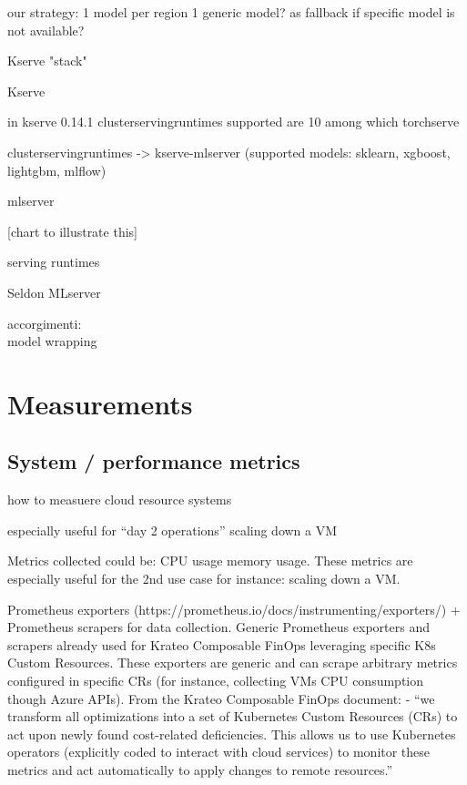 our strategy:
1 model per region
1 generic model? as fallback if specific model is not available?




Kserve "stack"

Kserve

in kserve 0.14.1
clusterservingruntimes
supported are 10
among which 
torchserve

clusterservingruntimes -> kserve-mlserver (supported models: sklearn, xgboost, lightgbm, mlflow)

mlserver

[chart to illustrate this]







serving runtimes

Seldon MLserver


accorgimenti: \\
model wrapping

\section{Measurements}




\subsection{System / performance metrics}


how to measuere cloud resource systems


especially useful for ``day 2 operations''
scaling down a VM


Metrics collected could be:
CPU usage
memory usage.
These metrics are especially useful for the 2nd use case for instance: scaling down a VM.


Prometheus exporters (https://prometheus.io/docs/instrumenting/exporters/) + Prometheus scrapers for data collection.
Generic Prometheus exporters and scrapers already used for Krateo Composable FinOps leveraging specific K8s Custom Resources. These exporters are generic and can scrape arbitrary metrics configured in specific CRs (for instance, collecting VMs CPU consumption though Azure APIs).
From the Krateo Composable FinOps document: 
- “we transform all optimizations into a set of Kubernetes Custom Resources (CRs) to act upon newly found cost-related deficiencies. This allows us to use Kubernetes operators (explicitly coded to interact with cloud services) to monitor these metrics and act automatically to apply changes to remote resources.”

